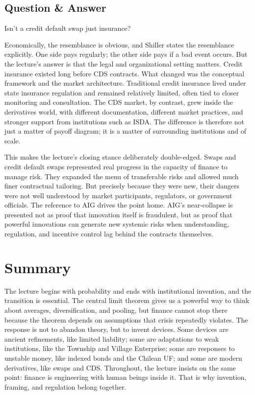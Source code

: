 \subsection{Question \& Answer}

Isn't a credit default swap just insurance?

Economically, the resemblance is obvious, and Shiller states the resemblance explicitly. One side pays regularly; the other side pays if a bad event occurs. But the lecture's answer is that the legal and organizational setting matters. Credit insurance existed long before CDS contracts. What changed was the conceptual framework and the market architecture. Traditional credit insurance lived under state insurance regulation and remained relatively limited, often tied to closer monitoring and consultation. The CDS market, by contrast, grew inside the derivatives world, with different documentation, different market practices, and stronger support from institutions such as ISDA. The difference is therefore not just a matter of payoff diagram; it is a matter of surrounding institutions and of scale.

This makes the lecture's closing stance deliberately double-edged. Swaps and credit default swaps represented real progress in the capacity of finance to manage risk. They expanded the menu of transferable risks and allowed much finer contractual tailoring. But precisely because they were new, their dangers were not well understood by market participants, regulators, or government officials. The reference to AIG drives the point home. AIG's near-collapse is presented not as proof that innovation itself is fraudulent, but as proof that powerful innovations can generate new systemic risks when understanding, regulation, and incentive control lag behind the contracts themselves.

\section{Summary}

The lecture begins with probability and ends with institutional invention, and the transition is essential. The central limit theorem gives us a powerful way to think about averages, diversification, and pooling, but finance cannot stop there because the theorem depends on assumptions that crisis repeatedly violates. The response is not to abandon theory, but to invent devices. Some devices are ancient refinements, like limited liability; some are adaptations to weak institutions, like the Township and Village Enterprise; some are responses to unstable money, like indexed bonds and the Chilean UF; and some are modern derivatives, like swaps and CDS. Throughout, the lecture insists on the same point: finance is engineering with human beings inside it. That is why invention, framing, and regulation belong together.